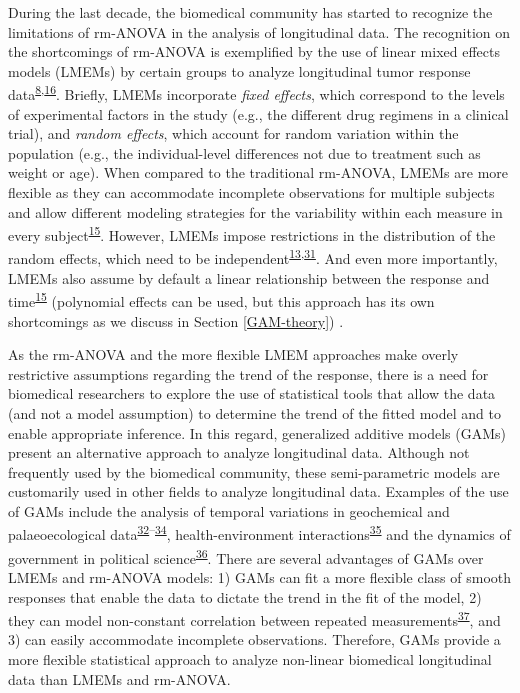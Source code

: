 \documentclass[
]{article}
\begin{document}
During the last decade, the biomedical community has started to recognize the limitations of rm-ANOVA in the analysis of longitudinal data. The recognition on the shortcomings of rm-ANOVA is exemplified by the use of linear mixed effects models (LMEMs) by certain groups to analyze longitudinal tumor response data\textsuperscript{\protect\hyperlink{ref-skala2010}{8},\protect\hyperlink{ref-vishwanath2009}{16}}. Briefly, LMEMs incorporate \emph{fixed effects}, which correspond to the levels of experimental factors in the study (e.g., the different drug regimens in a clinical trial), and \emph{random effects}, which account for random variation within the population (e.g., the individual-level differences not due to treatment such as weight or age). When compared to the traditional rm-ANOVA, LMEMs are more flexible as they can accommodate incomplete observations for multiple subjects and allow different modeling strategies for the variability within each measure in every subject\textsuperscript{\protect\hyperlink{ref-pinheiro2006}{15}}. However, LMEMs impose restrictions in the distribution of the random effects, which need to be independent\textsuperscript{\protect\hyperlink{ref-gueorguieva2004}{13},\protect\hyperlink{ref-barr2013}{31}}. And even more importantly, LMEMs also assume by default a linear relationship between the response and time\textsuperscript{\protect\hyperlink{ref-pinheiro2006}{15}} (polynomial effects can be used, but this approach has its own shortcomings as we discuss in Section \ref{GAM-theory}) .

As the rm-ANOVA and the more flexible LMEM approaches make overly restrictive assumptions regarding the trend of the response, there is a need for biomedical researchers to explore the use of statistical tools that allow the data (and not a model assumption) to determine the trend of the fitted model and to enable appropriate inference. In this regard, generalized additive models (GAMs) present an alternative approach to analyze longitudinal data. Although not frequently used by the biomedical community, these semi-parametric models are customarily used in other fields to analyze longitudinal data. Examples of the use of GAMs include the analysis of temporal variations in geochemical and palaeoecological data\textsuperscript{\protect\hyperlink{ref-rose2012}{32}--\protect\hyperlink{ref-simpson2018}{34}}, health-environment interactions\textsuperscript{\protect\hyperlink{ref-yang2012}{35}} and the dynamics of government in political science\textsuperscript{\protect\hyperlink{ref-beck1998}{36}}. There are several advantages of GAMs over LMEMs and rm-ANOVA models: 1) GAMs can fit a more flexible class of smooth responses that enable the data to dictate the trend in the fit of the model, 2) they can model non-constant correlation between repeated measurements\textsuperscript{\protect\hyperlink{ref-wood2017}{37}}, and 3) can easily accommodate incomplete observations. Therefore, GAMs provide a more flexible statistical approach to analyze non-linear biomedical longitudinal data than LMEMs and rm-ANOVA.
\end{document}

